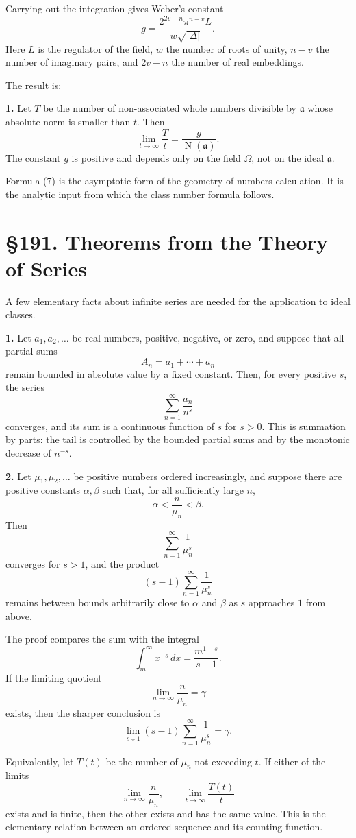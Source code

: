 \documentclass[11pt,a4paper]{book}
\newcommand{\webersection}[2]{\clearpage\section*{\S #1. #2}}
\providecommand{\ideala}{\mathfrak a}
\providecommand{\N}{\operatorname{N}}
\begin{document}
Carrying out the integration gives Weber's constant
\[
  g=\frac{2^{2v-n}\pi^{n-v}L}{w\sqrt{|\Delta|}}.
\tag{6}
\]
Here \(L\) is the regulator of the field, \(w\) the number of roots of unity, \(n-v\) the number of imaginary pairs, and \(2v-n\) the number of real embeddings.

The result is:

\textbf{1.} Let \(T\) be the number of non-associated whole numbers divisible by \(\ideala\) whose absolute norm is smaller than \(t\).  Then
\[
  \lim_{t\to\infty}\frac{T}{t}
  =\frac{g}{\N(\ideala)}.
\tag{7}
\]
The constant \(g\) is positive and depends only on the field \(\Omega\), not on the ideal \(\ideala\).

Formula (7) is the asymptotic form of the geometry-of-numbers calculation.  It is the analytic input from which the class number formula follows.

\webersection{191}{Theorems from the Theory of Series}

A few elementary facts about infinite series are needed for the application to ideal classes.

\textbf{1.} Let \(a_1,a_2,
\ldots\) be real numbers, positive, negative, or zero, and suppose that all partial sums
\[
  A_n=a_1+
\cdots+a_n
\]
remain bounded in absolute value by a fixed constant.  Then, for every positive \(s\), the series
\[
  \sum_{n=1}^\infty \frac{a_n}{n^s}
\tag{1}
\]
converges, and its sum is a continuous function of \(s\) for \(s>0\).  This is summation by parts: the tail is controlled by the bounded partial sums and by the monotonic decrease of \(n^{-s}\).

\textbf{2.} Let \(\mu_1,\mu_2,
\ldots\) be positive numbers ordered increasingly, and suppose there are positive constants \(\alpha,\beta\) such that, for all sufficiently large \(n\),
\[
  \alpha<\frac{n}{\mu_n}<\beta.
\tag{2}
\]
Then
\[
  \sum_{n=1}^{\infty}\frac1{\mu_n^s}
\tag{3}
\]
converges for \(s>1\), and the product
\[
  (s-1)
  \sum_{n=1}^{\infty}\frac1{\mu_n^s}
\tag{4}
\]
remains between bounds arbitrarily close to \(\alpha\) and \(\beta\) as \(s\) approaches \(1\) from above.

The proof compares the sum with the integral
\[
  \int_m^\infty x^{-s}\,dx=\frac{m^{1-s}}{s-1}.
\]
If the limiting quotient
\[
  \lim_{n\to\infty}\frac{n}{\mu_n}=\gamma
\tag{5}
\]
exists, then the sharper conclusion is
\[
  \lim_{s\downarrow1}(s-1)
  \sum_{n=1}^{\infty}\frac1{\mu_n^s}=\gamma.
\tag{6}
\]

Equivalently, let \(T(t)\) be the number of \(\mu_n\) not exceeding \(t\).  If either of the limits
\[
  \lim_{n\to\infty}\frac{n}{\mu_n},
  \qquad
  \lim_{t\to\infty}\frac{T(t)}{t}
\tag{7}
\]
exists and is finite, then the other exists and has the same value.  This is the elementary relation between an ordered sequence and its counting function.
\end{document}
